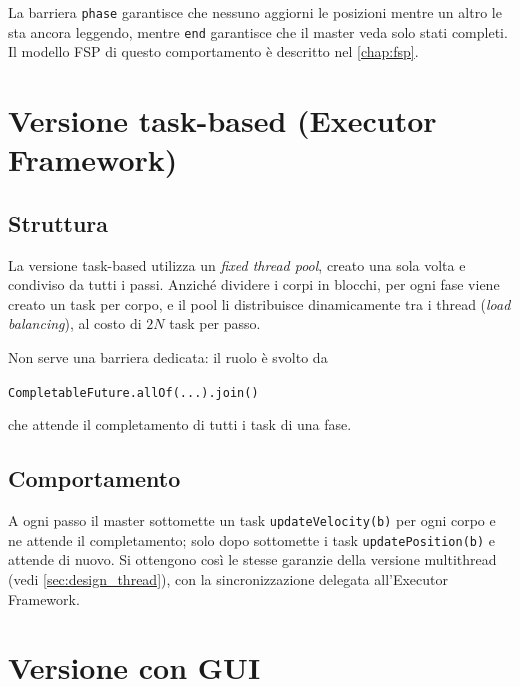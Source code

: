 La barriera \texttt{phase} garantisce che nessuno aggiorni le posizioni mentre un altro le sta ancora leggendo, mentre \texttt{end} garantisce che il master veda solo stati completi.
Il modello FSP di questo comportamento è descritto nel \cref{chap:fsp}.

%
%
\section{Versione task-based (Executor Framework)}
\label{sec:design_executor}

\subsection{Struttura}
La versione task-based utilizza un \emph{fixed thread pool}, creato una sola volta e condiviso da tutti i passi.
Anziché dividere i corpi in blocchi, per ogni fase viene creato un task per corpo, e il pool li distribuisce dinamicamente tra i thread (\emph{load balancing}), al costo di $2N$ task per passo.

Non serve una barriera dedicata: il ruolo è svolto da
\begin{center}
  \texttt{CompletableFuture.allOf(...).join()}
\end{center}
che attende il completamento di tutti i task di una fase.

\subsection{Comportamento}
A ogni passo il master sottomette un task \texttt{updateVelocity(b)} per ogni corpo e ne attende il completamento; solo dopo sottomette i task \texttt{updatePosition(b)} e attende di nuovo.
Si ottengono così le stesse garanzie della versione multithread (vedi \cref{sec:design_thread}), con la sincronizzazione delegata all'Executor Framework.

%
%
\section{Versione con GUI}
\label{sec:design_gui}

